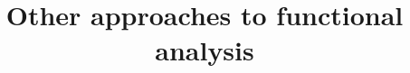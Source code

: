 \documentclass[a4paper, 11pt, oneside]{memoir}
\numberwithin{equation}{section}
\theoremstyle{plain}
\theoremstyle{remark}
\theoremstyle{definition}
\begin{document}
\title{Other approaches to functional analysis}
\author{}
\date{}



\frontmatter

\tableofcontents


\mainmatter







\backmatter


\end{document}
